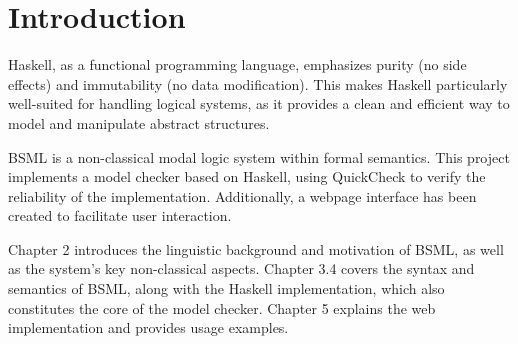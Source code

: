 
\section{Introduction}\label{sec:Introduction}

Haskell, as a functional programming language, 
emphasizes purity (no side effects) and immutability (no data modification). 
This makes Haskell particularly well-suited for handling logical systems, 
as it provides a clean and efficient way to model and manipulate abstract structures. 

BSML is a non-classical modal logic system within formal semantics. This project implements a model checker based on Haskell, 
using QuickCheck to verify the reliability of the implementation. 
Additionally, a webpage interface has been created to facilitate user interaction. 

Chapter 2 introduces the linguistic background and motivation of BSML, 
as well as the system’s key non-classical aspects. 
Chapter 3.4 covers the syntax and semantics of BSML, along with the Haskell implementation, 
which also constitutes the core of the model checker. 
Chapter 5 explains the web implementation and provides usage examples.